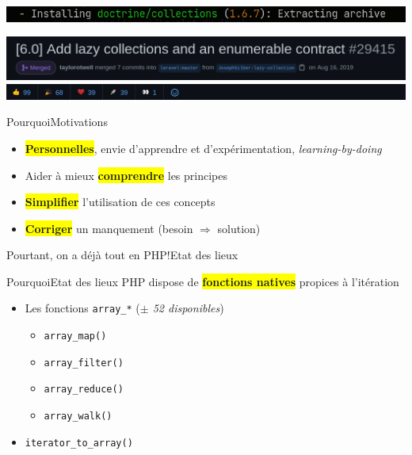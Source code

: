 \begin{frame}
    \includegraphics[width=\textwidth]{screenshots/Screenshot_20210520_104535.png}
\end{frame}

\begin{frame}
    \includegraphics[width=\textwidth]{screenshots/Screenshot_20210520_101402.png}
    \includegraphics[width=\textwidth]{screenshots/Screenshot_20210520_101458.png}
\end{frame}

\begin{frame}{Pourquoi}{Motivations}
    \begin{itemize}[<+->]
        \item \colorbox{yellow}{\textbf{Personnelles}}, envie d'apprendre et d'expérimentation, \textit{learning-by-doing}
        \item Aider à mieux \colorbox{yellow}{\textbf{comprendre}} les principes
        \item \colorbox{yellow}{\textbf{Simplifier}} l'utilisation de ces concepts
        \item \colorbox{yellow}{\textbf{Corriger}} un manquement (besoin $\Rightarrow$ solution)
    \end{itemize}
\end{frame}

\begin{frameC}{Pourtant, on a déjà tout en PHP!}{Etat des lieux}

\end{frameC}

\begin{frame}{Pourquoi}{Etat des lieux}
    PHP dispose de \colorbox{yellow}{\textbf{fonctions natives}} propices à l'itération

    \pause

    \begin{itemize}[<+->]
        \item Les fonctions \texttt{array\_*} (\textit{$\pm$ 52 disponibles})

        \begin{itemize}
            \item \texttt{array\_map()}
            \item \texttt{array\_filter()}
            \item \texttt{array\_reduce()}
            \item \texttt{array\_walk()}
        \end{itemize}
    \item \texttt{iterator\_to\_array()}
    \end{itemize}
\end{frame}

